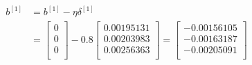 \documentclass{article}
\begin{document}
\[
    \begin{aligned}
        b^{[1]} & =b^{[1]}-\eta\delta^{[1]} \\
                & =\begin{bmatrix}
                       0 \\
                       0 \\
                       0 \\
                   \end{bmatrix}
        - 0.8 \begin{bmatrix}
                  0.00195131 \\
                  0.00203983 \\
                  0.00256363 \\
              \end{bmatrix}
        = \begin{bmatrix}
              -0.00156105 \\
              -0.00163187 \\
              -0.00205091 \\
          \end{bmatrix}
    \end{aligned}
\]
\end{document}
